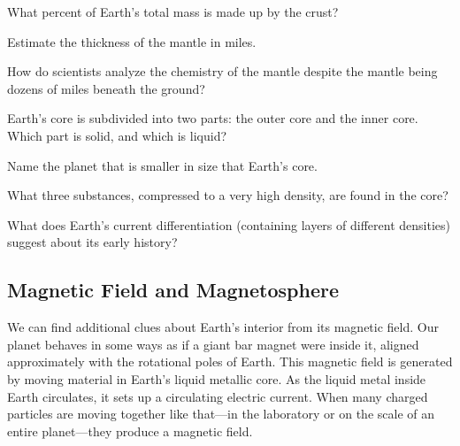 \documentclass{article}
\numberwithin{equation}{section}
\numberwithin{figure}{section}
\begin{document}
\begin{exercise}
    What percent of Earth's total mass is made up by the crust?
\end{exercise}

\begin{exercise}
    Estimate the thickness of the mantle in miles.
\end{exercise}

\begin{exercise}
    How do scientists analyze the chemistry of the mantle despite the mantle being dozens of miles beneath the ground?
\end{exercise}

\begin{exercise}
    Earth's core is subdivided into two parts: the outer core and the inner core. Which part is solid, and which is liquid?
\end{exercise}

\begin{exercise}
    Name the planet that is smaller in size that Earth's core.
\end{exercise}

\begin{exercise}
    What three substances, compressed to a very high density, are found in the core?
\end{exercise}

\begin{exercise}
    What does Earth's current differentiation (containing layers of different densities) suggest about its early history?
\end{exercise}

\clearpage
\subsection{Magnetic Field and Magnetosphere} \label{17sluw}

We can find additional clues about Earth's interior from its magnetic field. Our planet behaves in some ways as if a giant bar magnet were inside it, aligned approximately with the rotational poles of Earth. This magnetic field is generated by moving material in Earth's liquid metallic core. As the liquid metal inside Earth circulates, it sets up a circulating electric current. When many charged particles are moving together like that---in the laboratory or on the scale of an entire planet---they produce a magnetic field.

\vspace{1em}
\end{document}

